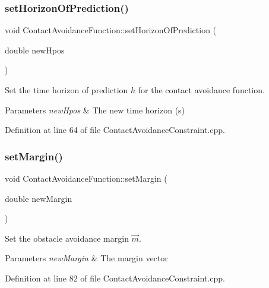 \subsubsection{\texorpdfstring{set\+Horizon\+Of\+Prediction()}{setHorizonOfPrediction()}}
{\footnotesize\ttfamily void Contact\+Avoidance\+Function\+::set\+Horizon\+Of\+Prediction (\begin{DoxyParamCaption}\item[{double}]{new\+Hpos }\end{DoxyParamCaption})}

Set the time horizon of prediction $ h $ for the contact avoidance function.


\begin{DoxyParams}{Parameters}
{\em new\+Hpos} & The new time horizon (s) \\
\hline
\end{DoxyParams}


Definition at line 64 of file Contact\+Avoidance\+Constraint.\+cpp.

\hypertarget{classocra_1_1ContactAvoidanceFunction_a4ae90405d1464527310ce1d93df2e862}{}\label{classocra_1_1ContactAvoidanceFunction_a4ae90405d1464527310ce1d93df2e862} 
\subsubsection{\texorpdfstring{set\+Margin()}{setMargin()}}
{\footnotesize\ttfamily void Contact\+Avoidance\+Function\+::set\+Margin (\begin{DoxyParamCaption}\item[{double}]{new\+Margin }\end{DoxyParamCaption})}

Set the obstacle avoidance margin $ \vec{m} $.


\begin{DoxyParams}{Parameters}
{\em new\+Margin} & The margin vector \\
\hline
\end{DoxyParams}


Definition at line 82 of file Contact\+Avoidance\+Constraint.\+cpp.

\hypertarget{classocra_1_1ContactAvoidanceFunction_aed2f145f17ff9fd8dd646018376ea7e9}{}\label{classocra_1_1ContactAvoidanceFunction_aed2f145f17ff9fd8dd646018376ea7e9} 
